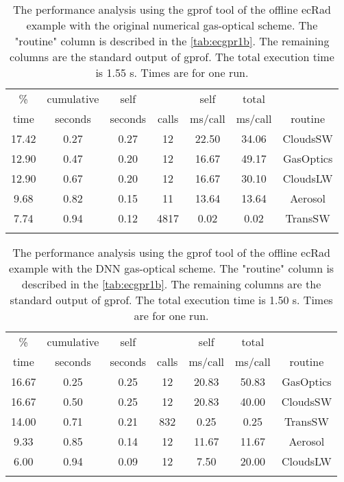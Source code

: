 \begin{table}[htb]\centering\begin{tabular}{ c c c c c c c } 
\hline
\%	    & cumulative &   self	   &	    &   self	&   total	& \\
time	&  seconds	&  seconds	   & calls	&  ms/call	&  ms/call	& routine \\
\hline
17.42	&      0.27	&     0.27	   & 12	    &    22.50	&    34.06	&  CloudsSW \\
12.90	&      0.47	&     0.20	   & 12	    &    16.67	&    49.17	&  GasOptics \\
12.90	&      0.67	&     0.20	   & 12	    &    16.67	&    30.10	&  CloudsLW \\
9.68	&      0.82	&     0.15	   & 11	    &    13.64	&    13.64	&  Aerosol \\
7.74	&      0.94	&     0.12	   & 4817	&     0.02	&     0.02	&  TransSW \\
\hline \\
\end{tabular}
\caption{The performance analysis using the gprof tool of the offline ecRad example with the original numerical gas-optical scheme. The "routine" column is described in the \autoref{tab:ecgpr1b}. The remaining columns are the standard output of gprof. The total execution time is 1.55 s. Times are for one run.}
\label{tab:ecgpr1a}
\end{table}

\begin{table}[htb]\centering\begin{tabular}{ c c c c c c c } 
\hline
\%	      & cumulative	&   self	&	        &   self	&   total	& \\
time	  &  seconds	&  seconds	&   calls	&  ms/call	&  ms/call	&  routine \\
\hline
16.67	  & 0.25	& 0.25	& 12	& 20.83	& 50.83	& GasOptics \\
16.67	  & 0.50	& 0.25	& 12	& 20.83	& 40.00	& CloudsSW  \\
14.00	  & 0.71	& 0.21	& 832	& 0.25	& 0.25	& TransSW \\
9.33	  & 0.85	& 0.14	& 12	& 11.67	& 11.67	& Aerosol \\
6.00	  & 0.94	& 0.09	& 12	& 7.50	& 20.00	& CloudsLW	\\
\hline \\
\end{tabular}
\caption{The performance analysis using the gprof tool of the offline ecRad example with the DNN gas-optical scheme. The "routine" column is described in the \autoref{tab:ecgpr1b}. The remaining columns are the standard output of gprof. The total execution time is 1.50 s. Times are for one run.}
\label{tab:ecgpr2a}
\end{table}

